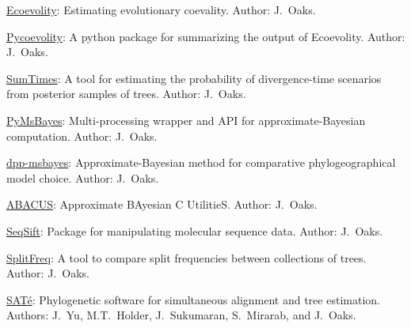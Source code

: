 \myHangIndent
\href{https://github.com/phyletica/ecoevolity}{Ecoevolity}:
    Estimating evolutionary coevality.
    Author: J.\ Oaks.

\myHangIndent
\href{https://github.com/phyletica/sumcoevolity}{Pycoevolity}:
    A python package for summarizing the output of Ecoevolity.
    Author: J.\ Oaks.

\myHangIndent
\href{https://github.com/phyletica/SumTimes}{SumTimes}:
    A tool for estimating the probability of divergence-time scenarios from
    posterior samples of trees.
    Author: J.\ Oaks.

\myHangIndent
\href{https://github.com/joaks1/PyMsBayes}{PyMsBayes}:
    Multi-processing wrapper and API for approximate-Bayesian
    computation.
    Author: J.\ Oaks.

\myHangIndent
\href{https://github.com/joaks1/dpp-msbayes}{dpp-msbayes}:
    Approximate-Bayesian method for comparative phylogeographical model choice.
    Author: J.\ Oaks.

\myHangIndent
\href{https://github.com/joaks1/abacus}{ABACUS}:
    Approximate BAyesian C UtilitieS.
    Author: J.\ Oaks.

\myHangIndent
\href{https://github.com/joaks1/SeqSift}{SeqSift}:
    Package for manipulating molecular sequence data.
    Author: J.\ Oaks.

\myHangIndent
\href{https://github.com/joaks1/abacus}{SplitFreq}:
    A tool to compare split frequencies between collections of trees.
    Author: J.\ Oaks.

\myHangIndent
\href{http://phylo.bio.ku.edu/software/sate/sate.html}{{SAT}\'{e}}:
    Phylogenetic software for simultaneous alignment and tree estimation.
    Authors: J.\ Yu, M.T.\ Holder, J.\ Sukumaran, S.\ Mirarab, and J.\ Oaks.
